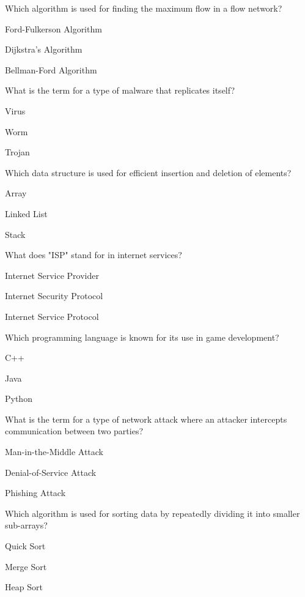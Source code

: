 \begin{enhancedmcq}{Which algorithm is used for finding the maximum flow in a flow network?}
\item Ford-Fulkerson Algorithm
\item Dijkstra's Algorithm
\item Bellman-Ford Algorithm

\end{enhancedmcq}
\begin{enhancedmcq}{What is the term for a type of malware that replicates itself?}
\item Virus
\item Worm
\item Trojan

\end{enhancedmcq}
\begin{enhancedmcq}{Which data structure is used for efficient insertion and deletion of elements?}
\item Array
\item Linked List
\item Stack

\end{enhancedmcq}
\begin{enhancedmcq}{What does "ISP" stand for in internet services?}
\item Internet Service Provider
\item Internet Security Protocol
\item Internet Service Protocol

\end{enhancedmcq}
\begin{enhancedmcq}{Which programming language is known for its use in game development?}
\item C++
\item Java
\item Python

\end{enhancedmcq}
\begin{enhancedmcq}{What is the term for a type of network attack where an attacker intercepts communication between two parties?}
\item Man-in-the-Middle Attack
\item Denial-of-Service Attack
\item Phishing Attack

\end{enhancedmcq}
\begin{enhancedmcq}{Which algorithm is used for sorting data by repeatedly dividing it into smaller sub-arrays?}
\item Quick Sort
\item Merge Sort
\item Heap Sort

\end{enhancedmcq}
